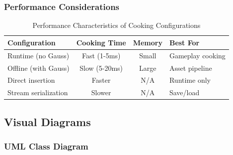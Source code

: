 \subsubsection{Performance Considerations}

\begin{table}[h]
\centering
\begin{tabular}{|l|c|c|l|}
\hline
\textbf{Configuration} & \textbf{Cooking Time} & \textbf{Memory} & \textbf{Best For} \\
\hline
Runtime (no Gauss) & Fast (1-5ms) & Small & Gameplay cooking \\
\hline
Offline (with Gauss) & Slow (5-20ms) & Large & Asset pipeline \\
\hline
Direct insertion & Faster & N/A & Runtime only \\
\hline
Stream serialization & Slower & N/A & Save/load \\
\hline
\end{tabular}
\caption{Performance Characteristics of Cooking Configurations}
\end{table}


\subsection{Visual Diagrams}

\subsubsection{UML Class Diagram}

